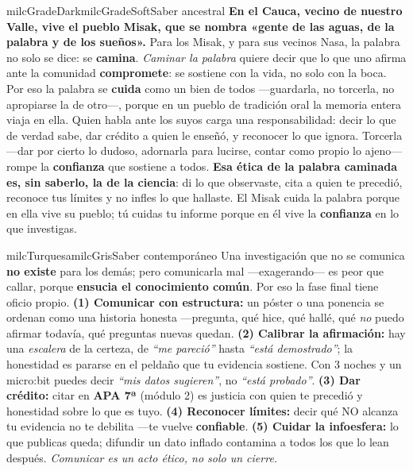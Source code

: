 \documentclass[11pt,letterpaper]{article}
\begin{document}
\begin{softbox}{milcGradeDark}{milcGradeSoft}{Saber ancestral}
\textbf{En el Cauca, vecino de nuestro Valle, vive el pueblo Misak, que se nombra «gente de las aguas, de la palabra y de los sueños».} Para los Misak, y para sus vecinos Nasa, la palabra no solo se dice: se \textbf{camina}. \emph{Caminar la palabra} quiere decir que lo que uno afirma ante la comunidad \textbf{compromete}: se sostiene con la vida, no solo con la boca. Por eso la palabra se \textbf{cuida} como un bien de todos ---guardarla, no torcerla, no apropiarse la de otro---, porque en un pueblo de tradición oral la memoria entera viaja en ella. Quien habla ante los suyos carga una responsabilidad: decir lo que de verdad sabe, dar crédito a quien le enseñó, y reconocer lo que ignora. Torcerla ---dar por cierto lo dudoso, adornarla para lucirse, contar como propio lo ajeno--- rompe la \textbf{confianza} que sostiene a todos. \textbf{Esa ética de la palabra caminada es, sin saberlo, la de la ciencia}: di lo que observaste, cita a quien te precedió, reconoce tus límites y no infles lo que hallaste. El Misak cuida la palabra porque en ella vive su pueblo; tú cuidas tu informe porque en él vive la \textbf{confianza} en lo que investigas.
\end{softbox}

\begin{softbox}{milcTurquesa}{milcGris}{Saber contemporáneo}
Una investigación que no se comunica \textbf{no existe} para los demás; pero comunicarla mal ---exagerando--- es peor que callar, porque \textbf{ensucia el conocimiento común}. Por eso la fase final tiene oficio propio. \textbf{(1) Comunicar con estructura:} un póster o una ponencia se ordenan como una historia honesta ---pregunta, qué hice, qué hallé, qué \emph{no} puedo afirmar todavía, qué preguntas nuevas quedan. \textbf{(2) Calibrar la afirmación:} hay una \emph{escalera} de la certeza, de \emph{``me pareció''} hasta \emph{``está demostrado''}; la honestidad es pararse en el peldaño que tu evidencia sostiene. Con 3 noches y un micro:bit puedes decir \emph{``mis datos sugieren''}, no \emph{``está probado''}. \textbf{(3) Dar crédito:} citar en \textbf{APA 7ª} (módulo 2) es justicia con quien te precedió y honestidad sobre lo que es tuyo. \textbf{(4) Reconocer límites:} decir qué NO alcanza tu evidencia no te debilita ---te vuelve \textbf{confiable}. \textbf{(5) Cuidar la infoesfera:} lo que publicas queda; difundir un dato inflado contamina a todos los que lo lean después. \emph{Comunicar es un acto ético, no solo un cierre.}
\end{softbox}
\end{document}
